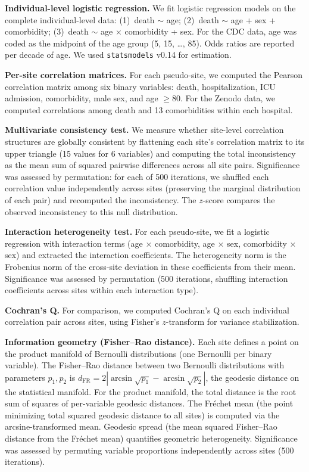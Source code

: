 \documentclass{article}
\begin{document}
\textbf{Individual-level logistic regression.}  We fit logistic regression
models on the complete individual-level data: (1)~death $\sim$ age; (2)~death
$\sim$ age + sex + comorbidity; (3)~death $\sim$ age $\times$ comorbidity +
sex.  For the CDC data, age was coded as the midpoint of the age group (5, 15,
\ldots, 85).  Odds ratios are reported per decade of age.  We used
\texttt{statsmodels} v0.14 for estimation.

\textbf{Per-site correlation matrices.}  For each pseudo-site, we computed the
Pearson correlation matrix among six binary variables: death, hospitalization,
ICU admission, comorbidity, male sex, and age $\geq 80$.  For the Zenodo data,
we computed correlations among death and 13 comorbidities within each hospital.

\textbf{Multivariate consistency test.}  We measure whether site-level
correlation structures are globally consistent by flattening each site's
correlation matrix to its upper triangle (15 values for 6 variables) and
computing the total inconsistency as the mean sum of squared pairwise
differences across all site pairs.  Significance was assessed by permutation:
for each of 500 iterations, we shuffled each correlation value independently
across sites (preserving the marginal distribution of each pair) and
recomputed the inconsistency.  The $z$-score compares the observed
inconsistency to this null distribution.

\textbf{Interaction heterogeneity test.}  For each pseudo-site, we fit a
logistic regression with interaction terms (age $\times$ comorbidity,
age $\times$ sex, comorbidity $\times$ sex) and extracted the interaction
coefficients.  The heterogeneity norm is the Frobenius norm of the cross-site
deviation in these coefficients from their mean.  Significance was assessed by
permutation (500 iterations, shuffling interaction coefficients across sites
within each interaction type).

\textbf{Cochran's Q.}  For comparison, we computed Cochran's Q on each
individual correlation pair across sites, using Fisher's $z$-transform for
variance stabilization.

\textbf{Information geometry (Fisher--Rao distance).}  Each site defines a
point on the product manifold of Bernoulli distributions (one Bernoulli per
binary variable).  The Fisher--Rao distance between two Bernoulli distributions
with parameters $p_1, p_2$ is $d_{\text{FR}} = 2|\arcsin\sqrt{p_1} -
\arcsin\sqrt{p_2}|$, the geodesic distance on the statistical manifold.  For
the product manifold, the total distance is the root sum of squares of
per-variable geodesic distances.  The Fr\'{e}chet mean (the point minimizing
total squared geodesic distance to all sites) is computed via the
arcsine-transformed mean.  Geodesic spread (the mean squared Fisher--Rao
distance from the Fr\'{e}chet mean) quantifies geometric heterogeneity.
Significance was assessed by permuting variable proportions independently
across sites (500 iterations).
\end{document}
